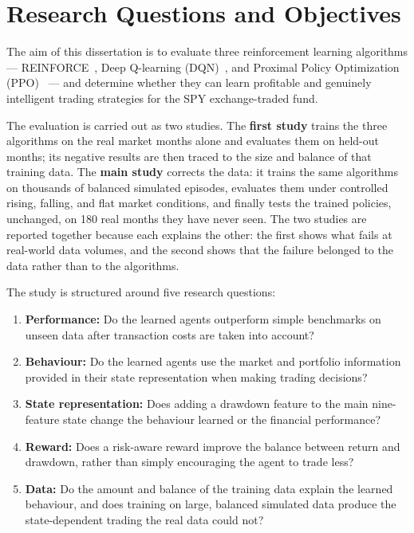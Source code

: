 \section{Research Questions and Objectives}

The aim of this dissertation is to evaluate three reinforcement learning
algorithms --- REINFORCE~\cite{williams1992}, Deep Q-learning (DQN)~\cite{mnih2015}, and Proximal Policy
Optimization (PPO)~\cite{schulman2017ppo} --- and determine whether they can learn profitable
and genuinely intelligent trading strategies for the SPY exchange-traded
fund.

The evaluation is carried out as two studies. The \textbf{first study}
trains the three algorithms on the real market months alone and
evaluates them on held-out months; its negative results are then traced
to the size and balance of that training data. The \textbf{main study}
corrects the data: it trains the same algorithms on thousands of
balanced simulated episodes, evaluates them under controlled rising,
falling, and flat market conditions, and finally tests the trained
policies, unchanged, on 180 real months they have never seen. The two
studies are reported together because each explains the other: the first
shows what fails at real-world data volumes, and the second shows that
the failure belonged to the data rather than to the algorithms.

The study is structured around five research questions:

\begin{enumerate}
\def\labelenumi{\arabic{enumi}.}
\item
  \textbf{Performance:} Do the learned agents outperform simple
  benchmarks on unseen data after transaction costs are taken into
  account?
\item
  \textbf{Behaviour:} Do the learned agents use the market and portfolio
  information provided in their state representation when making trading
  decisions?
\item
  \textbf{State representation:} Does adding a drawdown feature to the
  main nine-feature state change the behaviour learned or the financial
  performance?
\item
  \textbf{Reward:} Does a risk-aware reward improve the balance between
  return and drawdown, rather than simply encouraging the agent to trade
  less?
\item
  \textbf{Data:} Do the amount and balance of the training data explain
  the learned behaviour, and does training on large, balanced simulated
  data produce the state-dependent trading the real data could not?
\end{enumerate}

